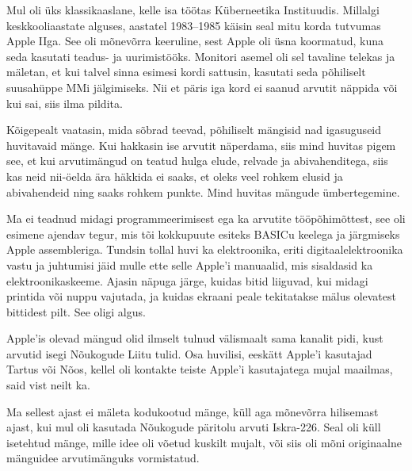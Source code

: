 

Mul oli üks klassikaaslane, kelle isa töötas Küberneetika 
Instituudis. Millalgi
keskkooliaastate alguses, aastatel 1983--1985 
käisin seal mitu korda tutvumas Apple 
IIga. See oli mõnevõrra keeruline, sest Apple oli 
üsna koormatud, kuna seda kasutati
teadus- ja uurimistööks. 
Monitori asemel oli sel tavaline telekas ja mäletan, et kui talvel sinna esimesi kordi sattusin, kasutati seda põhiliselt 
suusahüppe MMi jälgimiseks. Nii et päris iga kord ei saanud 
arvutit näppida või kui sai, siis ilma pildita. 


Kõigepealt vaatasin, mida sõbrad teevad, põhiliselt mängisid nad igasuguseid 
huvitavaid mänge. Kui hakkasin ise arvutit
näperdama, siis mind huvitas pigem see, et kui arvutimängud on 
teatud hulga elude, relvade ja 
abivahenditega, siis kas neid nii-öelda ära häkkida ei 
saaks, et oleks veel rohkem elusid ja abivahendeid ning 
saaks rohkem punkte. Mind huvitas mängude ümbertegemine. 

Ma ei teadnud midagi programmeerimisest ega ka arvutite 
tööpõhimõttest, see oli esimene ajendav tegur, mis tõi kokkupuute esiteks 
BASICu keelega ja järgmiseks Apple 
assembleriga. Tundsin tollal huvi ka 
elektroonika, eriti digitaalelektroonika vastu ja juhtumisi jäid mulle 
ette selle Apple'i manuaalid, mis sisaldasid ka 
elektroonikaskeeme. Ajasin näpuga järge, kuidas bitid liiguvad, kui midagi 
printida või nuppu vajutada, ja kuidas ekraani peale tekitatakse 
mälus olevatest bittidest pilt. See oligi algus.


Apple'is olevad mängud olid ilmselt tulnud välismaalt sama kanalit pidi, kust 
arvutid isegi Nõukogude Liitu tulid. Osa huvilisi, eeskätt 
Apple'i kasutajad Tartus või Nõos, kellel oli kontakte teiste Apple'i kasutajatega mujal 
maailmas, said vist neilt ka.


Ma sellest ajast ei mäleta kodukootud mänge, 
küll aga mõnevõrra hilisemast ajast, kui mul oli kasutada Nõukogude 
päritolu arvuti 
Iskra-226. Seal oli küll 
isetehtud mänge, mille idee oli võetud kuskilt mujalt, 
või siis oli mõni originaalne mänguidee arvutimänguks vormistatud. 

